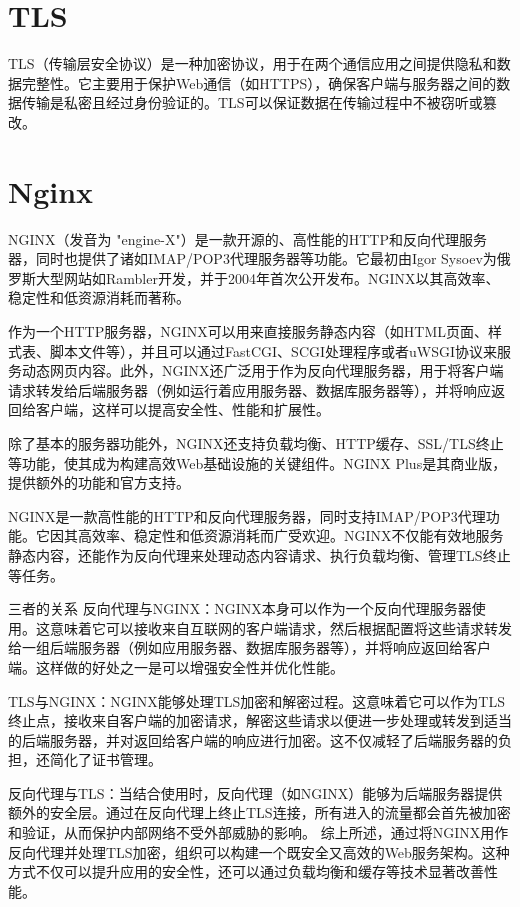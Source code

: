 \section{TLS}
TLS（传输层安全协议）是一种加密协议，用于在两个通信应用之间提供隐私和数据完整性。它主要用于保护Web通信（如HTTPS），确保客户端与服务器之间的数据传输是私密且经过身份验证的。TLS可以保证数据在传输过程中不被窃听或篡改。



\section{Nginx}
NGINX（发音为 "engine-X"）是一款开源的、高性能的HTTP和反向代理服务器，同时也提供了诸如IMAP/POP3代理服务器等功能。它最初由Igor Sysoev为俄罗斯大型网站如Rambler开发，并于2004年首次公开发布。NGINX以其高效率、稳定性和低资源消耗而著称。

作为一个HTTP服务器，NGINX可以用来直接服务静态内容（如HTML页面、样式表、脚本文件等），并且可以通过FastCGI、SCGI处理程序或者uWSGI协议来服务动态网页内容。此外，NGINX还广泛用于作为反向代理服务器，用于将客户端请求转发给后端服务器（例如运行着应用服务器、数据库服务器等），并将响应返回给客户端，这样可以提高安全性、性能和扩展性。

除了基本的服务器功能外，NGINX还支持负载均衡、HTTP缓存、SSL/TLS终止等功能，使其成为构建高效Web基础设施的关键组件。NGINX Plus是其商业版，提供额外的功能和官方支持。


NGINX是一款高性能的HTTP和反向代理服务器，同时支持IMAP/POP3代理功能。它因其高效率、稳定性和低资源消耗而广受欢迎。NGINX不仅能有效地服务静态内容，还能作为反向代理来处理动态内容请求、执行负载均衡、管理TLS终止等任务。

三者的关系
反向代理与NGINX：NGINX本身可以作为一个反向代理服务器使用。这意味着它可以接收来自互联网的客户端请求，然后根据配置将这些请求转发给一组后端服务器（例如应用服务器、数据库服务器等），并将响应返回给客户端。这样做的好处之一是可以增强安全性并优化性能。

TLS与NGINX：NGINX能够处理TLS加密和解密过程。这意味着它可以作为TLS终止点，接收来自客户端的加密请求，解密这些请求以便进一步处理或转发到适当的后端服务器，并对返回给客户端的响应进行加密。这不仅减轻了后端服务器的负担，还简化了证书管理。

反向代理与TLS：当结合使用时，反向代理（如NGINX）能够为后端服务器提供额外的安全层。通过在反向代理上终止TLS连接，所有进入的流量都会首先被加密和验证，从而保护内部网络不受外部威胁的影响。
综上所述，通过将NGINX用作反向代理并处理TLS加密，组织可以构建一个既安全又高效的Web服务架构。这种方式不仅可以提升应用的安全性，还可以通过负载均衡和缓存等技术显著改善性能。



